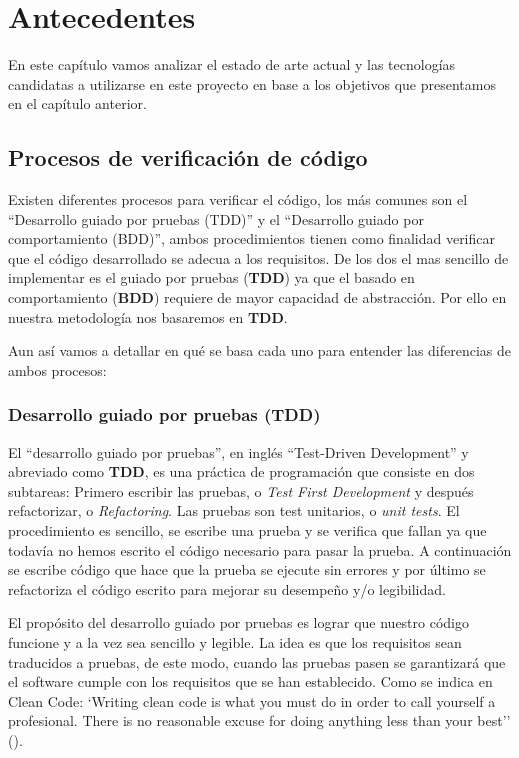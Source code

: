 \chapter{Antecedentes}

En este capítulo vamos analizar el estado de arte actual y las tecnologías candidatas a utilizarse en este proyecto en base a los objetivos que presentamos en el capítulo anterior.


\section {Procesos de verificación de código}

Existen diferentes procesos para verificar el código, los más comunes son el ``Desarrollo guiado por pruebas (TDD)'' y el ``Desarrollo guiado por comportamiento (BDD)'', ambos procedimientos tienen como finalidad verificar que el código desarrollado se adecua a los requisitos. De los dos el mas sencillo de implementar es el guiado por pruebas (\textbf{TDD}) ya que el basado en comportamiento (\textbf{BDD}) requiere de mayor capacidad de abstracción. Por ello en nuestra metodología nos basaremos en \textbf{TDD}.

\bigskip
Aun así vamos a detallar en qué se basa cada uno para entender las diferencias de ambos procesos:

\subsection {Desarrollo guiado por pruebas (TDD)}

El ``desarrollo guiado por pruebas'', en inglés ``Test-Driven Development'' y abreviado como \textbf{TDD}, es una práctica de programación que consiste en dos subtareas: Primero escribir las pruebas, o \textit{Test First Development} y después refactorizar, o \textit{Refactoring}. Las pruebas son test unitarios, o \textit{unit tests}. El procedimiento es sencillo, se escribe una prueba y se verifica que fallan ya que todavía no hemos escrito el código necesario para pasar la prueba. A continuación se escribe código que hace que la prueba se ejecute sin errores y por último se refactoriza el código escrito para mejorar su desempeño y/o legibilidad.

\bigskip
El propósito del desarrollo guiado por pruebas es lograr que nuestro código funcione y a la vez sea sencillo y legible. La idea es que los requisitos sean traducidos a pruebas, de este modo, cuando las pruebas pasen se garantizará que el software cumple con los requisitos que se han establecido. Como se indica en Clean Code: `Writing clean code is what you must do in order to call yourself a profesional. There is no reasonable excuse for doing anything less than your best'' (\cite{martin_clean_2009}).

